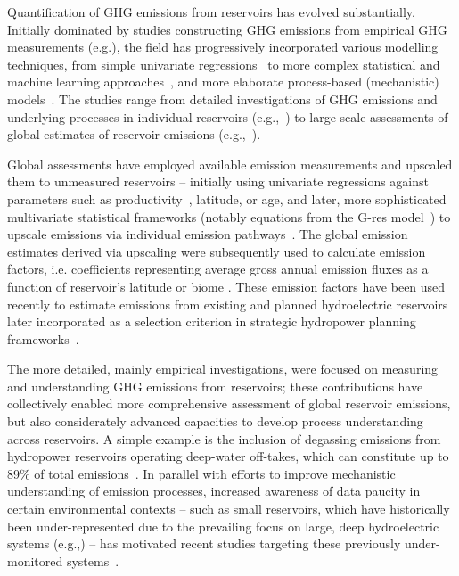 \documentclass[final,1p,times]{elsarticle}
\begin{document}
Quantification of \ac{GHG} emissions from reservoirs has evolved substantially. 
Initially dominated by studies constructing \ac{GHG} emissions from empirical \ac{GHG} measurements (e.g.\cite{Louis2000, dosSantos2006, GalyLacaux2006}), the field has progressively incorporated various modelling techniques, from simple univariate regressions~\cite{Barros2011, Huttunen2006, unesco_iha_ghg_2010, ghg_risk_tool_manual} to more complex statistical and machine learning approaches~\cite{Beaulieu2020b, WANG2025123441}, and more elaborate process-based (mechanistic) models~\cite{Berger2014, Lomov2024, Delwiche2022, Wu2022, Zhuang2023, Tan2024, SHI2025}.
The studies range from detailed investigations of \ac{GHG} emissions and underlying processes in individual reservoirs (e.g.,~\cite{gruca2011, Berger2014}) to large-scale assessments of global estimates of reservoir emissions (e.g.,~\cite{Louis2000, Deemer2016, Harrison2021, Soued2022}).

Global assessments have employed available emission measurements and upscaled them to unmeasured reservoirs -- initially using univariate regressions against parameters such as productivity~\cite{Deemer2016}, latitude, or age, and later, more sophisticated multivariate statistical frameworks (notably equations from the G-res model~\cite{Prairie2017b, Prairie2021}) to upscale emissions via individual emission pathways~\cite{Harrison2021, Soued2022}.
The global emission estimates derived via upscaling were subsequently used to calculate emission factors, i.e. coefficients representing average gross annual emission fluxes as a function of reservoir's latitude \citep{Harrison2021} or biome \citep{Soued2022}.
These emission factors have been used recently to estimate emissions from existing and planned hydroelectric reservoirs later incorporated as a selection criterion in strategic hydropower planning frameworks~\cite{Almeida2019, Carlino2024, Tangi2024}.

The more detailed, mainly empirical investigations, were focused on measuring and understanding \ac{GHG} emissions from reservoirs; these contributions have collectively enabled more comprehensive assessment of global reservoir emissions, but also considerately advanced capacities to develop process understanding across reservoirs.
A simple example is the inclusion of degassing emissions from hydropower reservoirs operating deep-water off-takes, which can constitute up to 89\% of total emissions~\cite{Soued2020exp}.
In parallel with efforts to improve mechanistic understanding of emission processes, increased awareness of data paucity in certain environmental contexts -- such as small reservoirs, which have historically been under-represented due to the prevailing focus on large, deep hydroelectric systems (e.g.,\cite{Barros2011, GalyLacaux2006, Delwiche2022, Tremblay2004}) -- has motivated recent studies targeting these previously under-monitored systems~\cite{Naslund2024}.
\end{document}
